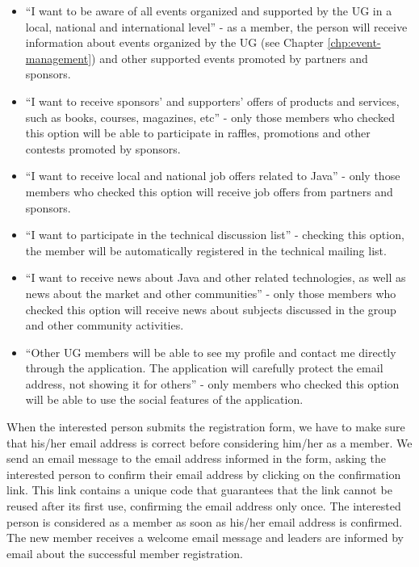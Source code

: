 \documentclass[envcountsame,envcountchap]{svmono}
\begin{document}
\begin{itemize}
\item ``I want to be aware of all events organized and supported by the UG in a local, national and international level'' - as a member, the person will receive information about events organized by the UG (see Chapter \ref{chp:event-management}) and other supported events promoted by partners and sponsors.

\item ``I want to receive sponsors' and supporters' offers of products and services, such as books, courses, magazines, etc'' - only those members who checked this option will be able to participate in raffles, promotions and other contests promoted by sponsors.

\item ``I want to receive local and national job offers related to Java'' - only those members who checked this option will receive job offers from partners and sponsors.

\item ``I want to participate in the technical discussion list'' - checking this option, the member will be automatically registered in the technical mailing list.

\item ``I want to receive news about Java and other related technologies, as well as news about the market and other communities'' - only those members who checked this option will receive news about subjects discussed in the group and other community activities.

\item ``Other UG members will be able to see my profile and contact me directly through the application. The application will carefully protect the email address, not showing it for others'' - only members who checked this option will be able to use the social features of the application.
\end{itemize}

When the interested person submits the registration form, we have to make sure that his/her email address is correct before considering him/her as a member. We send an email message to the email address informed in the form, asking the interested person to confirm their email address by clicking on the confirmation link. This link contains a unique code that guarantees that the link cannot be reused after its first use, confirming the email address only once. The interested person is considered as a member as soon as his/her email address is confirmed. The new member receives a welcome email message and leaders are informed by email about the successful member registration.
\end{document}
